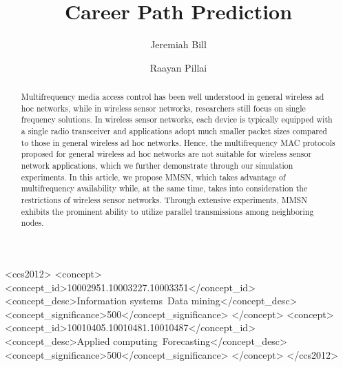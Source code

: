\documentclass[format=acmsmall, review=false, screen=true]{acmart}
\begin{document}
\title{Career Path Prediction}

\author{Jeremiah Bill}

\author{Raayan Pillai}


  
\begin{abstract}
Multifrequency media access control has been well understood in
general wireless ad hoc networks, while in wireless sensor networks,
researchers still focus on single frequency solutions. In wireless
sensor networks, each device is typically equipped with a single
radio transceiver and applications adopt much smaller packet sizes
compared to those in general wireless ad hoc networks. Hence, the
multifrequency MAC protocols proposed for general wireless ad hoc
networks are not suitable for wireless sensor network applications,
which we further demonstrate through our simulation experiments. In
this article, we propose MMSN, which takes advantage of
multifrequency availability while, at the same time, takes into
consideration the restrictions of wireless sensor networks. Through
extensive experiments, MMSN exhibits the prominent ability to utilize
parallel transmissions among neighboring nodes. 
\end{abstract}


%
%
\begin{CCSXML}
	<ccs2012>
		<concept>
			<concept_id>10002951.10003227.10003351</concept_id>
			<concept_desc>Information systems~Data mining</concept_desc>
			<concept_significance>500</concept_significance>
		</concept>
		<concept>
			<concept_id>10010405.10010481.10010487</concept_id>
			<concept_desc>Applied computing~Forecasting</concept_desc>
			<concept_significance>500</concept_significance>
		</concept>
	</ccs2012>
\end{CCSXML}


%
%






\maketitle

\renewcommand{\shortauthors}{J. Bill et al.}


\end{document}
